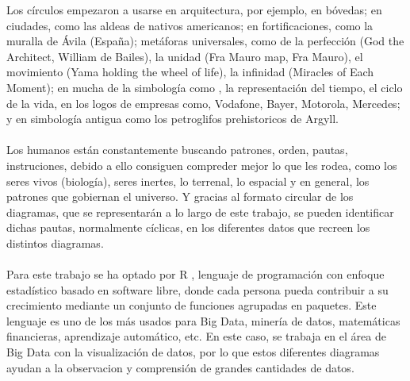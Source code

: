 \documentclass{article}\usepackage[]{graphicx}\usepackage[]{color}
\begin{document}
Los c\'irculos empezaron a usarse en arquitectura, por ejemplo, en b\'ovedas; en ciudades, como las aldeas de nativos americanos; en fortificaciones, como la muralla de \'Avila (Espa\~na); met\'aforas universales, como de la perfecci\'on (God the Architect, William de Bailes), la unidad (Fra Mauro map, Fra Mauro), el movimiento (Yama holding the wheel of life), la infinidad (Miracles of Each Moment); en mucha de la simbolog\'ia como , la representaci\'on del tiempo, el ciclo de la vida, en los logos de empresas como, Vodafone, Bayer, Motorola, Mercedes; y en simbolog\'ia antigua como los petroglifos prehistoricos de Argyll.~\\~\\
Los humanos est\'an constantemente buscando patrones, orden, pautas, instruciones, debido a ello consiguen compreder mejor lo que les rodea, como los seres vivos (biolog\'ia), seres inertes, lo terrenal, lo espacial y en general, los patrones que gobiernan el universo. Y gracias al formato circular de los diagramas, que se representar\'an a lo largo de este trabajo, se pueden identificar dichas pautas, normalmente c\'iclicas, en los diferentes datos que recreen los distintos diagramas.~\\~\\
Para este trabajo se ha optado por R\cite{R}
, lenguaje de programaci\'on con enfoque estad\'istico basado en software libre, donde cada persona pueda contribuir a su crecimiento mediante un conjunto de funciones agrupadas en paquetes. Este lenguaje es uno de los m\'as usados para Big Data, miner\'ia de datos, matem\'aticas financieras, aprendizaje autom\'atico, etc. En este caso, se trabaja en el \'area de Big Data con la visualizaci\'on de datos, por lo que estos diferentes diagramas ayudan a la observacion y comprensi\'on de grandes cantidades de datos.
\clearpage
\end{document}
